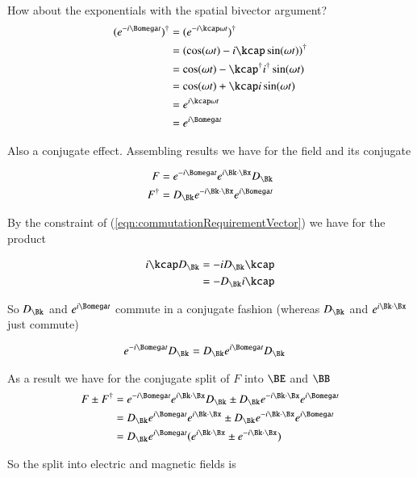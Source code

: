 How about the exponentials with the spatial bivector argument?
\begin{align*}
(e^{-i\Bomega t})^\dagger 
&=
(e^{-i \kcap \omega t})^\dagger  \\
&=
(\cos(\omega t) - i \kcap \sin(\omega t))^\dagger \\
&=
\cos(\omega t) - \kcap^\dagger i^\dagger \sin(\omega t) \\
&=
\cos(\omega t) + \kcap i \sin(\omega t) \\
&= 
e^{i \kcap \omega t} \\
&= 
e^{i \Bomega t} 
\end{align*}

Also a conjugate effect.  Assembling results we have for the field and its conjugate

\begin{align*}
F &= e^{-i\Bomega t} e^{i \Bk \cdot \Bx} D_\Bk  \\
F^\dagger &= D_\Bk e^{-i \Bk \cdot \Bx} e^{i\Bomega t}
\end{align*}

By the constraint of (\ref{eqn:commutationRequirementVector}) we have for the product

\begin{align*}
i \kcap D_\Bk 
&= 
-i D_\Bk \kcap \\
&= 
- D_\Bk i \kcap \\
\end{align*}

So $D_\Bk$ and $e^{i\Bomega t}$ commute in a conjugate fashion (whereas $D_\Bk$ and $e^{i\Bk \cdot \Bx}$ just commute)

\begin{align*}
e^{-i\Bomega t} D_\Bk &= D_\Bk e^{i\Bomega t} D_\Bk 
\end{align*}

As a result we have for the conjugate split of $F$ into $\BE$ and $\BB$
\begin{align*}
F \pm F^\dagger 
&= e^{-i\Bomega t} e^{i \Bk \cdot \Bx} D_\Bk \pm D_\Bk e^{-i \Bk \cdot \Bx} e^{i\Bomega t} \\
&= D_\Bk e^{i\Bomega t} e^{i \Bk \cdot \Bx} \pm D_\Bk e^{-i \Bk \cdot \Bx} e^{i\Bomega t} \\
&= D_\Bk e^{i\Bomega t} (e^{i \Bk \cdot \Bx} \pm e^{-i \Bk \cdot \Bx} ) \\
\end{align*}

So the split into electric and magnetic fields is

